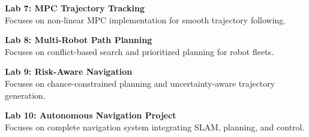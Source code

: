 \noindent\textbf{Lab 7: MPC Trajectory Tracking} \\
Focuses on non-linear MPC implementation for smooth trajectory following.

\vspace{0.2cm}

\noindent\textbf{Lab 8: Multi-Robot Path Planning} \\
Focuses on conflict-based search and prioritized planning for robot fleets.

\vspace{0.2cm}

\noindent\textbf{Lab 9: Risk-Aware Navigation} \\
Focuses on chance-constrained planning and uncertainty-aware trajectory generation.

\vspace{0.2cm}

\noindent\textbf{Lab 10: Autonomous Navigation Project} \\
Focuses on complete navigation system integrating SLAM, planning, and control.

\vspace{0.2cm}

\newpage
{}
